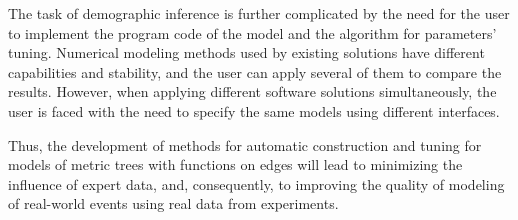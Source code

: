 The task of demographic inference is further complicated by the need for the user to implement the program code of the model and the algorithm for parameters' tuning.
Numerical modeling methods used by existing solutions have different capabilities and stability, and the user can apply several of them to compare the results.
However, when applying different software solutions simultaneously, the user is faced with the need to specify the same models using different interfaces.

Thus, the development of methods for automatic construction and tuning for models of metric trees with functions on edges will lead to minimizing the influence of expert data, and, consequently, to improving the quality of modeling of real-world events using real data from experiments.\\


%
%

